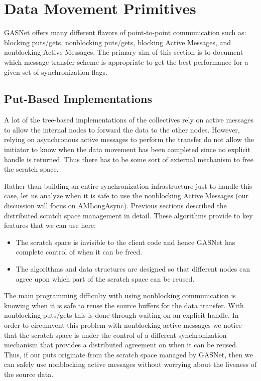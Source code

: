 \documentclass[times,10pt]{article}
\begin{document}
\section{Data Movement Primitives}
GASNet offers many different flavors of point-to-point communication such as: blocking puts/gets, nonblocking puts/gets, blocking Active Messages, and nonblocking Active Messages. The primary aim of this section is to document which message transfer scheme is appropriate to get the best performance for a given set of synchronization flags. 
\subsection {Put-Based Implementations}
A lot of the tree-based implementations of the collectives rely on active messages to allow the internal nodes to forward the data to the other nodes.  However, relying on asynchronous active messages to perform the transfer do not allow the initiator to know when the data movement has been completed since no explicit handle is returned. Thus there has to be some sort of external mechanism to free the scratch space.

Rather than building an entire synchronization infrastructure just to handle this case, let us analyze when it is safe to use the nonblocking Active Messages (our discussion will focus on AMLongAsync). Previous sections described the distributed scratch space management in detail. These algorithms provide to key features that we can use here:
\begin{itemize}
\item The scratch space is invisible to the client code and hence GASNet has complete control of when it can be freed. 
\item The algorithms and data structures are designed so that different nodes can agree upon which part of the scratch space can be reused.
\end{itemize}

The main programming difficulty with using nonblocking communication is knowing when it is safe to reuse the source buffers for the data transfer. With nonblocking puts/gets this is done through waiting on an explicit handle. In order to circumvent this problem with nonblocking active messages we notice that the scratch space is under the control of a different synchronization mechanism that provides a distributed agreement on when it can be reused. Thus, if our puts originate from the scratch space managed by GASNet, then we can safely use nonblocking active messages without worrying about the liveness of the source data. 
\end{document}
